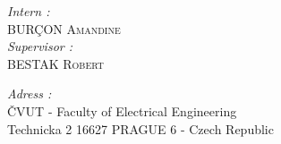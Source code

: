 \documentclass[main.tex]{subfiles}
\begin{document}
\begin{titlepage}
\begin{sffamily}
\begin{center}
    
    \begin{minipage}{0.4\textwidth}
        \begin{flushleft} \large
            \emph{Intern :} \\
            \textsc{BURÇON Amandine}\\
            \emph{Supervisor :} \\
            \textsc{BESTAK Robert}\\
        \end{flushleft}
    \end{minipage}
    \begin{minipage}{0.55\textwidth}
        \begin{flushright} \large
            \emph{Adress :} \\
            ČVUT - Faculty of Electrical Engineering \\
            Technicka 2 16627 PRAGUE 6 - Czech Republic
        \end{flushright}
    \end{minipage}
    
  \end{center}
  \end{sffamily}
\end{titlepage}
\end{document}
